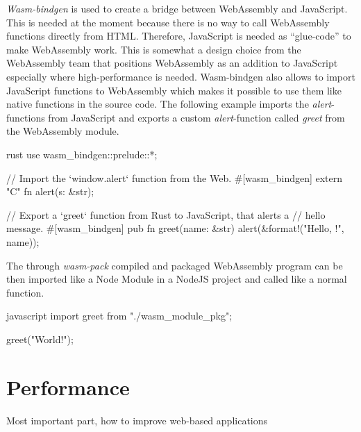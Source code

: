 \textit{Wasm-bindgen} is used to create a bridge between WebAssembly and JavaScript. This is needed at the moment because there is no way to call WebAssembly functions directly from HTML. Therefore, JavaScript is needed as ``glue-code'' to make WebAssembly work. This is somewhat a design choice from the WebAssembly team that positions WebAssembly as an addition to JavaScript especially where high-performance is needed. Wasm-bindgen also allows to import JavaScript functions to WebAssembly which makes it possible to use them like native functions in the source code. The following example imports the \textit{alert}-functions from JavaScript and exports a custom \textit{alert}-function called \textit{greet} from the WebAssembly module.
\begin{listing}
\begin{code}[]{rust}
use wasm_bindgen::prelude::*;

// Import the `window.alert` function from the Web.
#[wasm_bindgen]
extern "C" {
    fn alert(s: &str);
}

// Export a `greet` function from Rust to JavaScript, that alerts a
// hello message.
#[wasm_bindgen]
pub fn greet(name: &str) {
    alert(&format!("Hello, {}!", name));
}  
\end{code}
\caption{Rust source-code for WebAssembly \cite{rust:wasmbindgen}}
\label{lst:rust-wasm-bindgen}
\end{listing}
The through \textit{wasm-pack} compiled and packaged WebAssembly program can be then imported like a Node Module in a NodeJS project and called like a normal function.
\begin{listing}
\begin{code}[]{javascript}
import { greet } from "./wasm_module_pkg";

greet("World!");
\end{code}
\caption{Calling the WebAssembly module through JavaScript \cite{rust:wasmbindgen}}
\label{lst:js-wasm-bindgen}
\end{listing}

\newpage

\label{sec:performance}
\section{Performance}
Most important part, how to improve web-based applications
